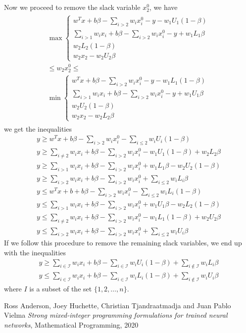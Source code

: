 \documentclass{article}
\begin{document}
Now we proceed to remove the slack variable $x^0_2$, we have
\begin{align}
	\begin{split}
	\max\begin{cases}
		w^Tx + b\beta -\sum_{i>2}w_ix^0_i - y - w_1U_1(1-\beta)\\
		\sum_{i>1}w_ix_i + b\beta - \sum_{i>2}w_ix^0_i -y + w_1L_1\beta\\
		w_2L_2(1-\beta)\\
		w_2x_2 - w_2U_2\beta
	\end{cases}\\
	\le w_2x^0_2\le\\
	\min\begin{cases}
		w^Tx + b\beta - \sum_{i>2}w_ix^0_i-y - w_1L_1(1-\beta)\\
		\sum_{i>1}w_ix_i + b\beta - \sum_{i>2}w_ix^0_i-y+w_1U_1\beta\\
		w_2U_2(1-\beta)\\
		w_2x_2-w_2L_2\beta
	\end{cases}
\end{split}
\end{align}
we get the inequalities
\begin{subequations}
\begin{align}
	y \ge w^Tx + b\beta - \sum_{i>2}w_ix^0_i - \sum_{i \le 2}w_iU_i(1-\beta)\\
	y \ge \sum_{i\neq 2}w_ix_i + b\beta - \sum_{i>2}w_ix^0_i - w_1U_1(1-\beta) + w_2L_2\beta\\
	y \ge \sum_{i>1}w_ix_i + b\beta - \sum_{i>2}w_ix^0_i + w_1L_1\beta - w_2U_2(1-\beta)\\
	y \ge \sum_{i>2}w_ix_i + b\beta - \sum_{i>2}w_ix^0_i  + \sum_{i\le 2}w_iL_i\beta\\
	y \le w^Tx + b + b\beta - \sum_{i>2}w_ix^0_i - \sum_{i\le 2}w_iL_i(1-\beta)\\
	y \le \sum_{i>1}w_ix_i + b\beta - \sum_{i>2}w_ix^0_i  + w_1U_1\beta - w_2L_2(1-\beta)\\
	y \le \sum_{i\neq 2}w_ix_i + b\beta - \sum_{i>2}w_ix^0_i - w_1L_1(1-\beta) + w_2U_2\beta\\
	y \le \sum_{i > 2}w_ix_i + b\beta - \sum_{i>2}w_ix^0_i + \sum_{i\le 2}w_iU_i\beta
\end{align}
\end{subequations}
If we follow this procedure to remove the remaining slack variables, we end up with the inequalities
\begin{subequations}
	\begin{align}
		y \ge \sum_{i\in\mathcal{I}}w_ix_i + b\beta - \sum_{i\in\mathcal{I}}w_iU_i(1-\beta) + \sum_{i\notin\mathcal{I}}w_iL_i\beta\\
		y \le \sum_{i\in\mathcal{I}}w_ix_i + b\beta - \sum_{i\in\mathcal{I}}w_iL_i(1-\beta) + \sum_{i\notin\mathcal{I}}w_iU_i\beta
	\end{align}
\end{subequations}
where $I$ is a subset of the set $\{1, 2, \hdots, n\}$.



\begin{thebibliography}{9}
	Ross Anderson, Joey Huchette, Christian Tjandraatmadja and Juan Pablo Vielma \textit{Strong mixed-integer programming formulations for trained neural networks}, Mathematical Programming, 2020
\end{thebibliography}
\end{document}
